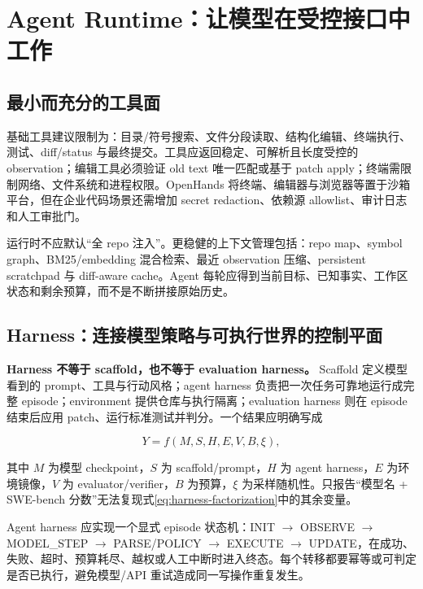 \documentclass[10pt,a4paper,UTF8,fontset=none]{ctexart}
\newcommand{\ident}[1]{{\rmfamily #1}}
\begin{document}
\section{Agent Runtime：让模型在受控接口中工作}

\subsection{最小而充分的工具面}

基础工具建议限制为：目录/符号搜索、文件分段读取、结构化编辑、终端执行、测试、diff/status 与最终提交。工具应返回稳定、可解析且长度受控的 observation；编辑工具必须验证 old text 唯一匹配或基于 patch apply；终端需限制网络、文件系统和进程权限。OpenHands 将终端、编辑器与浏览器等置于沙箱平台\cite{wang2024openhands}，但在企业代码场景还需增加 secret redaction、依赖源 allowlist、审计日志和人工审批门。

运行时不应默认“全 repo 注入”。更稳健的上下文管理包括：repo map、symbol graph、BM25/embedding 混合检索、最近 observation 压缩、persistent scratchpad 与 diff-aware cache。Agent 每轮应得到当前目标、已知事实、工作区状态和剩余预算，而不是不断拼接原始历史。

\subsection{Harness：连接模型策略与可执行世界的控制平面}

\textbf{Harness 不等于 scaffold，也不等于 evaluation harness。} Scaffold 定义模型看到的 prompt、工具与行动风格；agent harness 负责把一次任务可靠地运行成完整 episode；environment 提供仓库与执行隔离；evaluation harness 则在 episode 结束后应用 patch、运行标准测试并判分。一个结果应明确写成

\begin{equation}
Y=f(M,S,H,E,V,B,\xi),
\label{eq:harness-factorization}
\end{equation}

其中 $M$ 为模型 checkpoint，$S$ 为 scaffold/prompt，$H$ 为 agent harness，$E$ 为环境镜像，$V$ 为 evaluator/verifier，$B$ 为预算，$\xi$ 为采样随机性。只报告“模型名 + SWE-bench 分数”无法复现式\eqref{eq:harness-factorization}中的其余变量。

Agent harness 应实现一个显式 episode 状态机：\ident{INIT} $\rightarrow$ \ident{OBSERVE} $\rightarrow$ \ident{MODEL\_STEP} $\rightarrow$ \ident{PARSE/POLICY} $\rightarrow$ \ident{EXECUTE} $\rightarrow$ \ident{UPDATE}，在成功、失败、超时、预算耗尽、越权或人工中断时进入终态。每个转移都要幂等或可判定是否已执行，避免模型/API 重试造成同一写操作重复发生。
\end{document}
